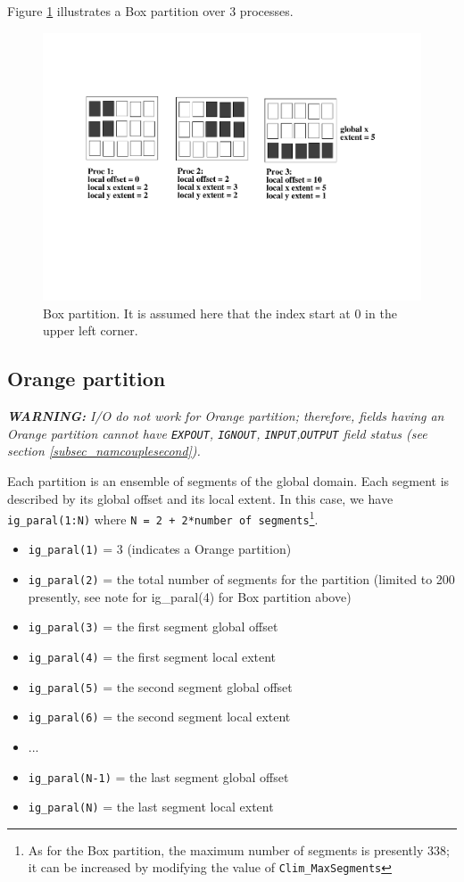 Figure \ref{box_partition} illustrates a Box partition over 3
processes.  
 
\begin{figure}
\includegraphics[scale=.6]{figures/box_new} 
\caption{Box partition. It is assumed here that the index start at 0 in the upper left corner.}
\label{box_partition}
\end{figure} 
  
\subsection{Orange partition}

{\it {\bf WARNING:} I/O do not work for Orange partition; therefore, fields having an Orange partition cannot have {\tt EXPOUT}, {\tt IGNOUT}, {\tt INPUT},{\tt OUTPUT} field status (see section \ref{subsec_namcouplesecond}).}

Each partition is an ensemble of segments of the global domain. Each
segment is described by its global offset and its local extent.  In
this case, we have {\tt ig\_paral(1:N)} where {\tt N = 2 + 2*number of
segments}\footnote{As for the Box partition, the maximum number of
segments is presently 338; it can be increased by modifying the value
of {\tt Clim\_MaxSegments}}.

\begin{itemize}
 \item {\tt ig\_paral(1)} = 3 (indicates a Orange partition)
 \item {\tt ig\_paral(2)} = the total number of segments for the partition (limited to 200 presently, see note for ig\_paral(4) for Box partition above)
 \item {\tt ig\_paral(3)} = the first segment global offset
 \item {\tt ig\_paral(4)} = the first segment local extent
 \item {\tt ig\_paral(5)} = the second segment global offset
 \item {\tt ig\_paral(6)} = the second segment local extent
 \item ...
 \item {\tt ig\_paral(N-1)} = the last segment global offset
 \item {\tt ig\_paral(N)} = the last segment local extent
\end{itemize}

